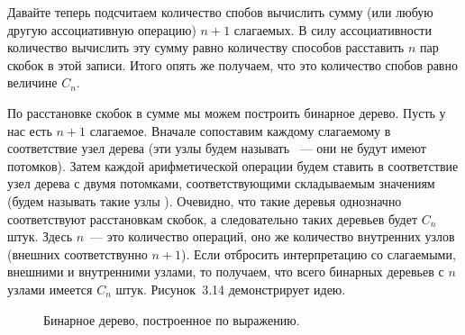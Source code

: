 Давайте теперь подсчитаем количество спобов вычислить сумму (или любую другую ассоциативную операцию) $n+1$ слагаемых. В силу ассоциативности количество вычислить эту сумму равно количеству способов расставить $n$ пар скобок в этой записи. Итого опять же получаем, что это количество спобов равно величине $C_n$.

По расстановке скобок в сумме мы можем построить бинарное дерево. Пусть у нас есть $n+1$ слагаемое. Вначале сопоставим каждому слагаемому в соответствие узел дерева (эти узлы будем называть ~--- они не будут имеют потомков). Затем каждой арифметической операции будем ставить в соответствие узел дерева с двумя потомками, соответствующими складываемым значениям (будем называть такие узлы ). Очевидно, что такие деревья однозначно соответствуют расстановкам скобок, а следовательно таких деревьев будет $C_n$ штук. Здесь $n$~--- это количество операций, оно же количество внутренних узлов (внешних соответствунно $n+1$). Если отбросить интерпретацию со слагаемыми, внешними и внутренними узлами, то получаем, что всего бинарных деревьев с $n$ узлами имеется $C_n$ штук. Рисунок~3.14 демонстрирует идею.

\begin{figure}[h]
\centering
{}
\caption{Бинарное дерево, построенное по выражению.}
\end{figure}

